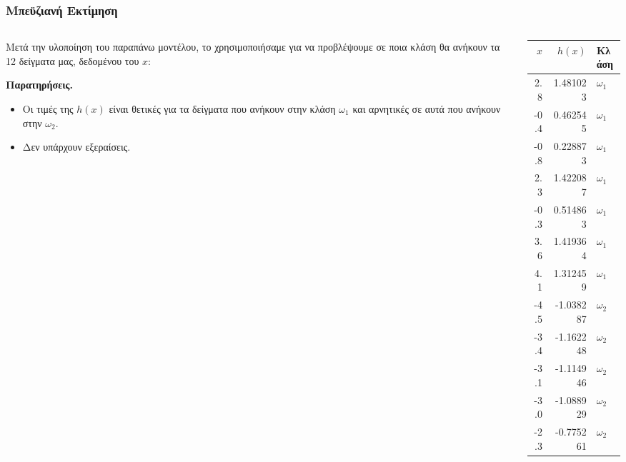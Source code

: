 \documentclass{beamer}
\begin{document}
\begin{frame}
  \frametitle{Μπεϋζιανή Εκτίμηση}

  \begin{columns}[T]
    \begin{column}{0.5\textwidth}
        Μετά την υλοποίηση του παραπάνω μοντέλου, το χρησιμοποιήσαμε για να προβλέψουμε σε ποια κλάση θα ανήκουν 
        τα 12 δείγματα μας, δεδομένου του $x$:
        
      \textbf{Παρατηρήσεις.} \\
      \begin{itemize}
          \item Οι τιμές της $h(x)$ είναι θετικές για τα δείγματα που ανήκουν στην κλάση $\omega_1$ και αρνητικές σε αυτά που ανήκουν στην $\omega_2$. 
          \item Δεν υπάρχουν εξεραίσεις.
      \end{itemize}
    \end{column}

    \begin{column}{0.5\textwidth}
      \begin{tabular}{rrl}
        \toprule
        $x$ & $h(x)$ & Κλάση \\
        \midrule
        2.8 & 1.481023 & \(\omega_1\) \\
        -0.4 & 0.462545 & \(\omega_1\) \\
        -0.8 & 0.228873 & \(\omega_1\) \\
        2.3 & 1.422087 & \(\omega_1\) \\
        -0.3 & 0.514863 & \(\omega_1\) \\
        3.6 & 1.419364 & \(\omega_1\) \\
        4.1 & 1.312459 & \(\omega_1\) \\
        -4.5 & -1.038287 & \(\omega_2\) \\
        -3.4 & -1.162248 & \(\omega_2\) \\
        -3.1 & -1.114946 & \(\omega_2\) \\
        -3.0 & -1.088929 & \(\omega_2\) \\
        -2.3 & -0.775261 & \(\omega_2\) \\
        \bottomrule
      \end{tabular}
    \end{column}
  \end{columns}
\end{frame}
\end{document}
